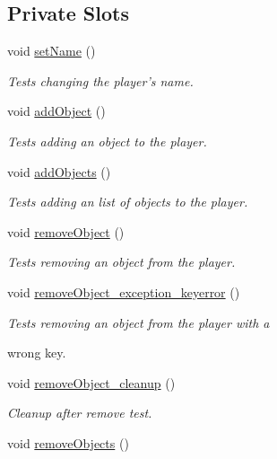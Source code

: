 \subsection*{Private Slots}
\begin{DoxyCompactItemize}
\item 
void \hyperlink{classdefault__player_af05f4c53d52a79c6731621d9488e9f7b}{set\-Name} ()
\begin{DoxyCompactList}\small\item\em Tests changing the player's name. \end{DoxyCompactList}\item 
void \hyperlink{classdefault__player_ad6397356e54526292b855405f410eb22}{add\-Object} ()
\begin{DoxyCompactList}\small\item\em Tests adding an object to the player. \end{DoxyCompactList}\item 
void \hyperlink{classdefault__player_afc294e2e20ad28051ae631ea2cc1e24e}{add\-Objects} ()
\begin{DoxyCompactList}\small\item\em Tests adding an list of objects to the player. \end{DoxyCompactList}\item 
void \hyperlink{classdefault__player_aabdaf180a7edd892d73f8662c780a6d1}{remove\-Object} ()
\begin{DoxyCompactList}\small\item\em Tests removing an object from the player. \end{DoxyCompactList}\item 
void \hyperlink{classdefault__player_a697b3a67efeaa7a58b4a002589496912}{remove\-Object\-\_\-exception\-\_\-keyerror} ()
\begin{DoxyCompactList}\small\item\em Tests removing an object from the player with a \par
wrong key. \end{DoxyCompactList}\item 
void \hyperlink{classdefault__player_ae779c54333e90ea35dab0d387d26e829}{remove\-Object\-\_\-cleanup} ()
\begin{DoxyCompactList}\small\item\em Cleanup after remove test. \end{DoxyCompactList}\item 
void \hyperlink{classdefault__player_a8fed2f00ce871cd36a69c2fa1ae9e92a}{remove\-Objects} ()

\end{DoxyCompactItemize}
